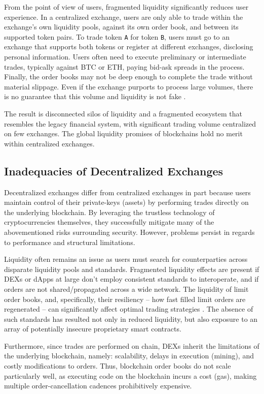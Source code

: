 \documentclass[UTF8,nofonts]{article}
\begin{document}
\begin{multicols}{2}
From the point of view of users, fragmented liquidity significantly reduces user experience. In a centralized exchange, users are only able to trade within the exchange's own liquidity pools, against its own order book, and between its supported token pairs. To trade token \verb|A| for token \verb|B|, users must go to an exchange that supports both tokens or register at different exchanges, disclosing personal information. Users often need to execute preliminary or intermediate trades, typically against BTC or ETH, paying bid-ask spreads in the process. Finally, the order books may not be deep enough to complete the trade without material slippage. Even if the exchange purports to process large volumes, there is no guarantee that this volume and liquidity is not fake \cite{fakevolume}.

The result is disconnected silos of liquidity and a fragmented ecosystem that resembles the legacy financial system, with significant trading volume centralized on few exchanges. The global liquidity promises of blockchains hold no merit within centralized exchanges.

\subsection{Inadequacies of Decentralized Exchanges}
Decentralized exchanges differ from centralized exchanges in part because users maintain control of their private-keys (assets) by performing trades directly on the underlying blockchain. By leveraging the trustless technology of cryptocurrencies themselves, they successfully mitigate many of the abovementioned risks surrounding security. However, problems persist in regards to performance and structural limitations. 

Liquidity often remains an issue as users must search for counterparties across disparate liquidity pools and standards. Fragmented liquidity effects are present if DEXs or dApps at large don't employ consistent standards to interoperate, and if orders are not shared/propagated across a wide network. The liquidity of limit order books, and, specifically, their resiliency -- how fast filled limit orders are regenerated -- can significantly affect optimal trading strategies \cite{limitorderliquidity}. The absence of such standards has resulted not only in reduced liquidity, but also exposure to an array of potentially insecure proprietary smart contracts.

Furthermore, since trades are performed on chain, DEXs inherit the limitations of the underlying blockchain, namely: scalability, delays in execution (mining), and costly modifications to orders. Thus, blockchain order books do not scale particularly well, as executing code on the blockchain incurs a cost (gas), making multiple order-cancellation cadences prohibitively expensive. 


\end{multicols}
\end{document}
